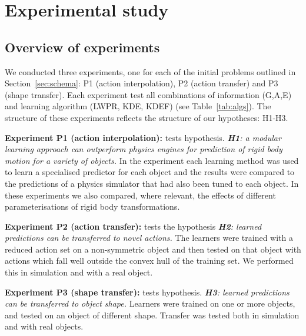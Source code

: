 
\newlength{\barchartwidth}
\setlength{\barchartwidth}{6.5cm}

\section{Experimental study}\label{sec:Experiment}

\subsection{Overview of experiments}\label{sec:Experiment.Overview}

We conducted three experiments, one for each of the initial problems outlined in Section~\ref{sec:schema}: P1 (action interpolation), P2 (action transfer) and P3
(shape transfer). Each experiment test all combinations of information (G,A,E) and learning algorithm (LWPR, KDE, KDEF) (see Table~\ref{tab:algs}). The structure of these experiments reflects the structure of our hypotheses: H1-H3.

{\bf Experiment P1 (action interpolation):} tests hypothesis. {\em {\bf H1}: a modular learning approach can outperform physics engines for prediction of rigid body motion for a variety of objects.} In the experiment each learning method was used to learn a specialised predictor for each object and the results were compared to the predictions of a physics simulator that had also been tuned to each object. In these experiments we also compared, where relevant, the effects of different parameterisations of rigid body transformations.

{\bf Experiment P2 (action transfer):} tests the hypothesis {\em {\bf H2}: learned predictions can be transferred to novel actions.} The learners were trained with a reduced action set on a non-symmetric object and then tested on that object with actions which fall well outside the convex hull of the training set. We performed this in simulation and with a real object.

{\bf Experiment P3 (shape transfer):} tests hypothesis. {\em {\bf H3}: learned predictions can be transferred to object shape.} Learners were trained on one or more objects, and tested on an object of different shape. Transfer was tested both in simulation and with real objects.

